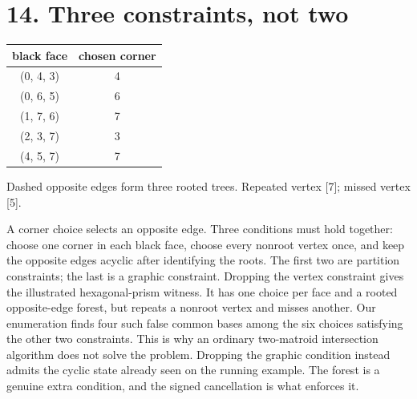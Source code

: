 \section*{14. Three constraints, not two}
\begin{center}\begin{minipage}{.86\textwidth}\centering
{}\par\medskip \begin{tabular}{cc}\hline
black face & chosen corner\\\hline
(0, 4, 3) & 4\\
(0, 6, 5) & 6\\
(1, 7, 6) & 7\\
(2, 3, 7) & 3\\
(4, 5, 7) & 7\\
\hline\end{tabular}\par Dashed opposite edges form three rooted trees. Repeated vertex [7]; missed vertex [5].
\end{minipage}\end{center}
A corner choice selects an opposite edge. Three conditions must hold together: choose one corner in each black face, choose every nonroot vertex once, and keep the opposite edges acyclic after identifying the roots. The first two are partition constraints; the last is a graphic constraint. Dropping the vertex constraint gives the illustrated hexagonal-prism witness. It has one choice per face and a rooted opposite-edge forest, but repeats a nonroot vertex and misses another. Our enumeration finds four such false common bases among the six choices satisfying the other two constraints. This is why an ordinary two-matroid intersection algorithm does not solve the problem. Dropping the graphic condition instead admits the cyclic state already seen on the running example. The forest is a genuine extra condition, and the signed cancellation is what enforces it.

